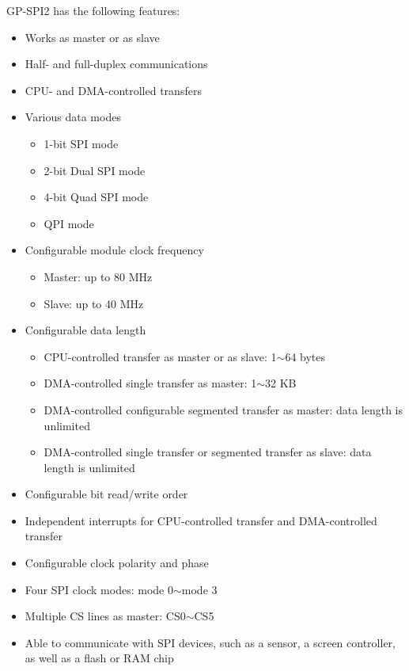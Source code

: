 \documentclass[main\_\_EN.tex]{subfiles}
\begin{document}
GP-SPI2 has the following features:
\begin{itemize}
    \item Works as master or as slave
    \item Half- and full-duplex communications
    \item CPU- and DMA-controlled transfers
    \item Various data modes
        \begin{itemize}
            \item 1-bit SPI mode
            \item 2-bit Dual SPI mode
            \item 4-bit Quad SPI mode
            \item QPI mode
        \end{itemize}
    \item Configurable module clock frequency
        \begin{itemize}
            \item Master: up to 80 MHz
            \item Slave: up to 40 MHz
        \end{itemize}
    \item Configurable data length
    \begin{itemize}
        \item CPU-controlled transfer as master or as slave: 1$\sim$64 bytes
        \item DMA-controlled single transfer as master: 1$\sim$32 KB
        \item DMA-controlled configurable segmented transfer as master: data length is unlimited 
        \item DMA-controlled single transfer or segmented transfer as slave: data length is unlimited 
    \end{itemize}
    \item Configurable bit read/write order
    \item Independent interrupts for CPU-controlled transfer and DMA-controlled transfer 
    \item Configurable clock polarity and phase
    \item Four SPI clock modes: mode 0$\sim$mode 3
    \item Multiple CS lines as master: CS0$\sim$CS5
    \item Able to communicate with SPI devices, such as a sensor, a screen controller, as well as a flash or RAM chip
\end{itemize}
\end{document}
